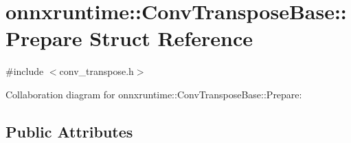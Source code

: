 \hypertarget{structonnxruntime_1_1ConvTransposeBase_1_1Prepare}{}\section{onnxruntime\+:\+:Conv\+Transpose\+Base\+:\+:Prepare Struct Reference}
\label{structonnxruntime_1_1ConvTransposeBase_1_1Prepare}


{\ttfamily \#include $<$conv\+\_\+transpose.\+h$>$}



Collaboration diagram for onnxruntime\+:\+:Conv\+Transpose\+Base\+:\+:Prepare\+:
\subsection*{Public Attributes}
